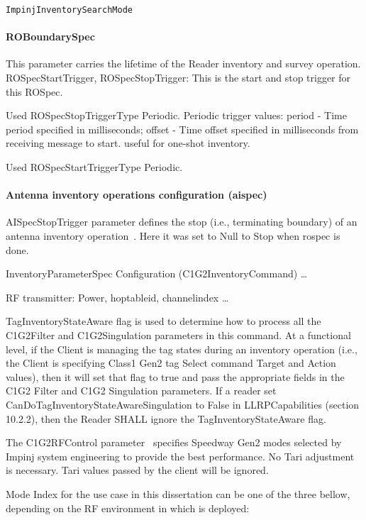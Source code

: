 \texttt{ImpinjInventorySearchMode}



\paragraph{ROBoundarySpec}

This parameter carries the lifetime of the Reader inventory and survey operation.
ROSpecStartTrigger, ROSpecStopTrigger: This is the start and stop trigger for this ROSpec.

Used ROSpecStopTriggerType Periodic.
Periodic trigger values: period - Time period specified in milliseconds; offset - Time offset specified in milliseconds from receiving message to start. useful for one-shot inventory.

Used ROSpecStartTriggerType Periodic.

\paragraph{Antenna inventory operations configuration (\ac{aispec})}

AISpecStopTrigger parameter defines the stop (i.e., terminating boundary) of an antenna inventory operation~\cite[sec. 11.2.2.1]{LowLevelReader}. Here it was set to Null to Stop when \ac{rospec} is done.

InventoryParameterSpec Configuration (C1G2InventoryCommand) \dots

RF transmitter: Power, hoptableid, channelindex \dots

TagInventoryStateAware flag is used to determine how to process all the C1G2Filter and C1G2Singulation parameters in this command. At a functional level, if the Client is managing the tag states during an inventory operation (i.e., the Client is specifying Class1 Gen2 tag Select command Target and Action values), then it will set that flag to true and pass the appropriate fields in the C1G2 Filter and C1G2 Singulation parameters. If a reader set CanDoTagInventoryStateAwareSingulation to False in LLRPCapabilities (section 10.2.2), then the Reader SHALL ignore the TagInventoryStateAware flag.

The C1G2RFControl parameter~\cite[sec. 3.1.4]{ImpinjOctaneLLRP} specifies Speedway Gen2 modes selected by Impinj system engineering to provide the best performance. No Tari adjustment is necessary. Tari values passed by the client will be ignored.

Mode Index for the use case in this dissertation can be one of the three bellow, depending on the RF environment in which is deployed: 

